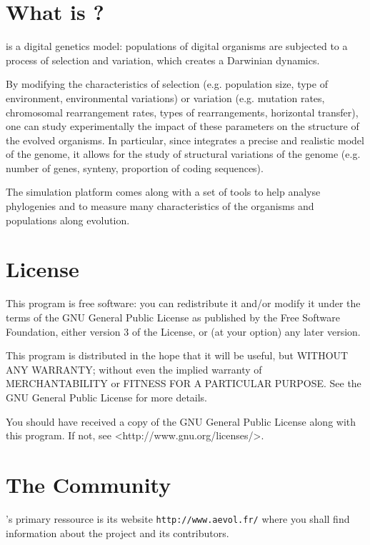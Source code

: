 \label{chap:intro}


\vspace{5mm}

\section{What is \aevol{}?}
\label{sec:whatis}
\aevol{} is a digital genetics model: populations of digital organisms are
subjected to a process of selection and variation, which creates a
Darwinian dynamics.

By modifying the characteristics of selection (e.g. population size,
type of environment, environmental variations) or variation (e.g.
mutation rates, chromosomal rearrangement rates, types of
rearrangements, horizontal transfer), one can study experimentally the
impact of these parameters on the structure of the evolved organisms.
In particular, since \aevol{} integrates a precise and realistic model of
the genome, it allows for the study of structural variations of the
genome (e.g. number of genes, synteny, proportion of coding sequences).

The simulation platform comes along with a set of tools to help analyse
phylogenies and to measure many characteristics of the organisms and
populations along evolution.


\section{License}
\label{sec:license}
This program is free software: you can redistribute it and/or modify
it under the terms of the GNU General Public License as published by
the Free Software Foundation, either version 3 of the License, or
(at your option) any later version.

This program is distributed in the hope that it will be useful,
but WITHOUT ANY WARRANTY; without even the implied warranty of
MERCHANTABILITY or FITNESS FOR A PARTICULAR PURPOSE.  See the
GNU General Public License for more details.

You should have received a copy of the GNU General Public License
along with this program.  If not, see <http://www.gnu.org/licenses/>.


\section{The \aevol{} Community}
\label{sec:comm}
\aevol{}'s primary ressource is its website \verb?http://www.aevol.fr/? where you shall find information about the project and its contributors.

